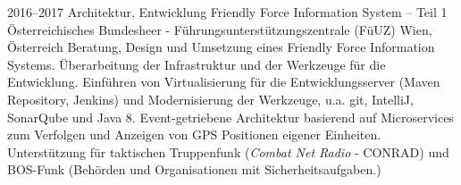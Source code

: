 \cventry
{2016--2017}
{Architektur, Entwicklung}
{Friendly Force Information System -- Teil 1}
{Österreichisches Bundesheer - Führungsunterstützungszentrale (FüUZ)}
{Wien, Österreich}
{
  Beratung, Design und Umsetzung eines Friendly Force Information Systems.\newline
  Überarbeitung der Infrastruktur und der Werkzeuge für die Entwicklung.
  Einführen von Virtualisierung für die Entwicklungsserver (Maven Repository, Jenkins)
  und Modernisierung der Werkzeuge, u.a. git, IntelliJ, SonarQube und Java 8.\newline
  Event-getriebene Architektur basierend auf Microservices zum Verfolgen und Anzeigen
  von GPS Positionen eigener Einheiten. Unterstützung für taktischen Truppenfunk
  (\emph{Combat Net Radio} - CONRAD) und BOS-Funk (Behörden und Organisationen
  mit Sicherheitsaufgaben.)
}
